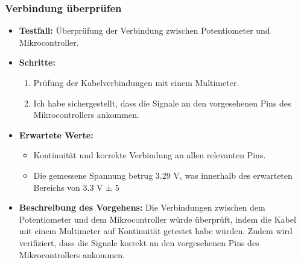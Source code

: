 \subsubsection{Verbindung überprüfen}
\begin{itemize}
    \item \textbf{Testfall:} Überprüfung der Verbindung zwischen Potentiometer und Mikrocontroller.
    \item \textbf{Schritte:}
    \begin{enumerate}
        \item Prüfung der Kabelverbindungen mit einem Multimeter.
        \item Ich habe sichergestellt, dass die Signale an den vorgesehenen Pins des Mikrocontrollers ankommen.
    \end{enumerate}
    \item \textbf{Erwartete Werte:}
    \begin{itemize}
        \item Kontinuität und korrekte Verbindung an allen relevanten Pins.
        \item Die gemessene Spannung betrug 3.29 V, was innerhalb des erwarteten Bereichs von 3.3 V ± 5%
    \end{itemize}
    \item \textbf{Beschreibung des Vorgehens:}
Die Verbindungen zwischen dem Potentiometer und dem Mikrocontroller würde überprüft, indem die Kabel mit einem Multimeter auf Kontinuität getestet habe würden. Zudem wird verifiziert, dass die Signale korrekt an den vorgesehenen Pins des Mikrocontrollers ankommen.
\end{itemize}


